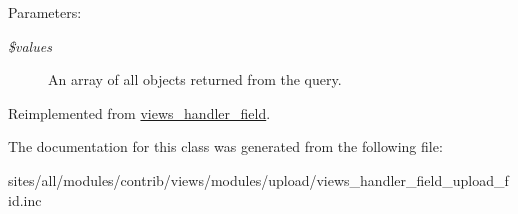 \begin{Desc}
\item[Parameters:]
\begin{description}
\item[{\em \$values}]An array of all objects returned from the query. \end{description}
\end{Desc}


Reimplemented from \hyperlink{classviews__handler__field_e30a1d9c98c62ae40c90b938e09cd0ec}{views\_\-handler\_\-field}.

The documentation for this class was generated from the following file:\begin{CompactItemize}
\item 
sites/all/modules/contrib/views/modules/upload/views\_\-handler\_\-field\_\-upload\_\-fid.inc\end{CompactItemize}
